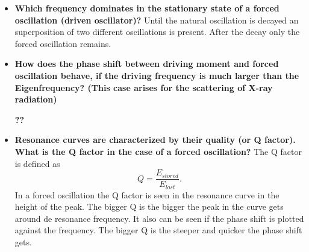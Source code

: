 \begin{itemize}
	
	\item \textbf{Which frequency dominates in the stationary
	state of a forced oscillation (driven oscillator)?}
	Until the natural oscillation is decayed an superposition of two different oscillations is present.
	After the decay only the forced oscillation remains.
	
	\item \textbf{How does the phase shift between driving moment
	and forced oscillation behave, if the driving
	frequency is much larger than the Eigenfrequency?
	(This case arises for the scattering
	of X-ray radiation)} 

\textbf{??}


	
	\item \textbf{Resonance curves are characterized by their
	quality (or Q factor). What is the Q factor in
	the case of a forced oscillation?}
The Q factor is defined as 
\[
Q = \frac{E_{stored}}{E_{lost}}.
\]
In a forced oscillation the Q factor is seen in the resonance curve in the height of the peak. 
The bigger Q is the bigger the peak in the curve gets around de resonance frequency. 
It also can be seen if the phase shift is plotted against the frequency. 
The bigger Q is the steeper and quicker the phase shift gets.

	
\end{itemize}